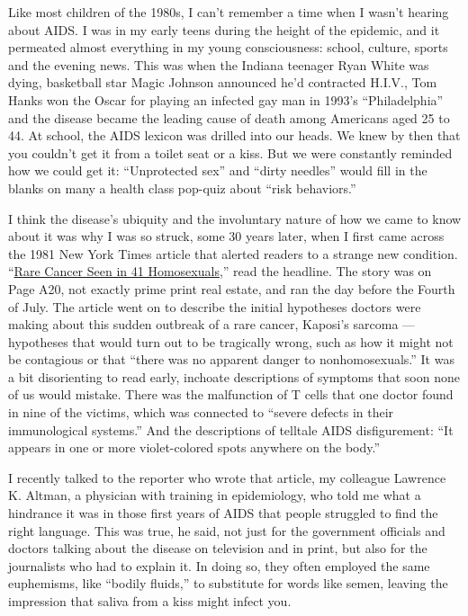 Like most children of the 1980s, I can't remember a time when I wasn't
hearing about AIDS. I was in my early teens during the height of the
epidemic, and it permeated almost everything in my young consciousness:
school, culture, sports and the evening news. This was when the Indiana
teenager Ryan White was dying, basketball star Magic Johnson announced
he'd contracted H.I.V., Tom Hanks won the Oscar for playing an infected
gay man in 1993's ``Philadelphia'' and the disease became the leading
cause of death among Americans aged 25 to 44. At school, the AIDS
lexicon was drilled into our heads. We knew by then that you couldn't
get it from a toilet seat or a kiss. But we were constantly reminded how
we could get it: ``Unprotected sex'' and ``dirty needles'' would fill in
the blanks on many a health class pop-quiz about ``risk behaviors.''

I think the disease's ubiquity and the involuntary nature of how we came
to know about it was why I was so struck, some 30 years later, when I
first came across the 1981 New York Times article that alerted readers
to a strange new condition.
``\href{https://www.nytimes.com/1981/07/03/us/rare-cancer-seen-in-41-homosexuals.html}{Rare
Cancer Seen in 41 Homosexuals},'' read the headline. The story was on
Page A20, not exactly prime print real estate, and ran the day before
the Fourth of July. The article went on to describe the initial
hypotheses doctors were making about this sudden outbreak of a rare
cancer, Kaposi's sarcoma --- hypotheses that would turn out to be
tragically wrong, such as how it might not be contagious or that ``there
was no apparent danger to nonhomosexuals.'' It was a bit disorienting to
read early, inchoate descriptions of symptoms that soon none of us would
mistake. There was the malfunction of T cells that one doctor found in
nine of the victims, which was connected to ``severe defects in their
immunological systems.'' And the descriptions of telltale AIDS
disfigurement: ``It appears in one or more violet-colored spots anywhere
on the body.''

I recently talked to the reporter who wrote that article, my colleague
Lawrence K. Altman, a physician with training in epidemiology, who told
me what a hindrance it was in those first years of AIDS that people
struggled to find the right language. This was true, he said, not just
for the government officials and doctors talking about the disease on
television and in print, but also for the journalists who had to explain
it. In doing so, they often employed the same euphemisms, like ``bodily
fluids,'' to substitute for words like semen, leaving the impression
that saliva from a kiss might infect you.

